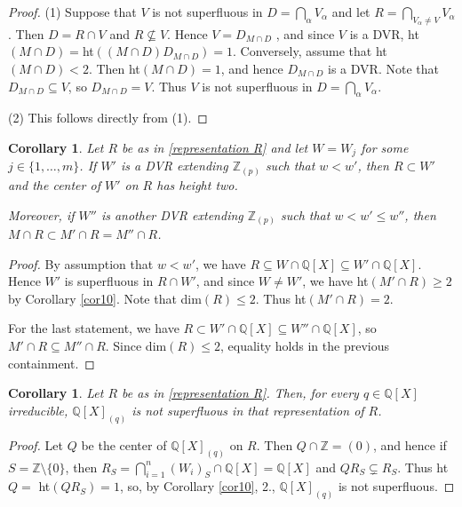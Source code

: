 \documentclass[10pt]{article}
\numberwithin{equation}{section}
\newtheorem{Cor}[equation]{Corollary}
\theoremstyle{definition}
\theoremstyle{definition}
\newcommand{\Q}{\mathbb{Q}}
\newcommand{\Z}{\mathbb{Z}}
\newcommand\rc { \color{red}}
\begin{document}
\begin{proof}
(1) Suppose that $V$ is not superfluous in $D = \bigcap\limits_{\alpha}V_{\alpha}$
and let $R = \bigcap\limits_{V_{\alpha} \neq V}V_{\alpha}$. Then $D = R \cap V$ and $R \nsubseteq V$.
Hence $V = D_{M \cap D}$ \cite[Lemma 1.3]{HeinzerOhm}, and since $V$ is a DVR,
ht$(M \cap D) = $ht$((M \cap D)D_{M \cap D}) = 1$. Conversely, assume that ht$(M \cap D) < 2$.
Then ht$(M \cap D)=1$, and hence $D_{M \cap D}$ is a DVR.
Note that $D_{M \cap D} \subseteq V$, so $D_{M \cap D} = V$.
Thus $V$ is not superfluous in $D = \bigcap\limits_{\alpha}V_{\alpha}$.

(2) This follows directly from (1).
\end{proof}




\begin{Cor}\label{center superfluous DVR}
Let $R$ be as in \eqref{representation R} and let $W=W_j$ for some $j\in\{1,\ldots,m\}$. If $W'$ is a DVR extending $\Z_{(p)}$ such that $w<w'$, then $R\subset W'$ and the center of $W'$ on $R$ has height two.

Moreover, if $W''$ is another DVR extending $\Z_{(p)}$ such that $w<w'\leq w''$, then $M\cap R\subset M'\cap R=M''\cap R$.
\end{Cor}

\begin{proof}
By assumption that $w<w'$, we have $R\subseteq W\cap\Q[X]\subseteq W'\cap\Q[X]$.
Hence $W'$ is superfluous in $R \cap W'$, and since $W \neq W'$, we have ht$(M' \cap R) \geq 2$ by Corollary \ref{cor10}. Note that dim$(R) \leq 2$.
Thus ht$(M' \cap R) = 2$.

For the last statement, we have $R\subset W'\cap\Q[X]\subseteq W''\cap\Q[X]$, so $M'\cap R\subseteq M''\cap R$. Since dim$(R) \leq 2$, equality holds in the previous containment.
\end{proof}

\begin{Cor}\label{nonunitary not superfluous}
Let $R$ be as in \eqref{representation R}. Then, for every $q\in\Q[X]$ irreducible, $\Q[X]_{(q)}$ is not superfluous in that representation of $R$. %
\end{Cor}
\begin{proof}
Let $Q$ be the center of $\Q[X]_{(q)}$ on $R$.
Then $Q \cap \Z = (0)$, and hence if $S = \Z \setminus \{0\}$, then $R_S = \bigcap\limits_{i=1}^n(W_i)_S \cap \Q[X] = \Q[X]$
\cite[Proposition 43.5]{Gilm} and $QR_S \subsetneq R_S$. Thus ht$Q=$ ht$(QR_S) = 1$,
so, by Corollary \ref{cor10}, 2., $\Q[X]_{(q)}$ is not superfluous.
\end{proof}
\end{document}
